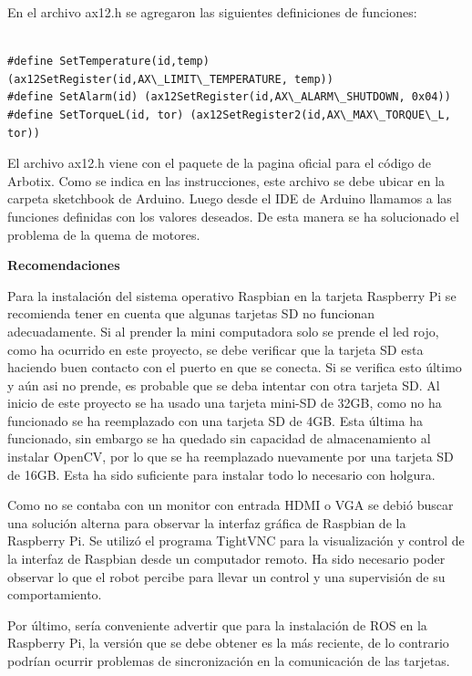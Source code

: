 \begin{itemize}
En el archivo ax12.h se agregaron las siguientes definiciones de funciones:

\begin{lstlisting}

#define SetTemperature(id,temp) (ax12SetRegister(id,AX\_LIMIT\_TEMPERATURE, temp))
#define SetAlarm(id) (ax12SetRegister(id,AX\_ALARM\_SHUTDOWN, 0x04)) 
#define SetTorqueL(id, tor) (ax12SetRegister2(id,AX\_MAX\_TORQUE\_L, tor)) 
\end{lstlisting}
 

El archivo ax12.h viene con el paquete de la pagina oficial para el código de Arbotix. Como se indica en las instrucciones, este archivo se debe ubicar en la carpeta sketchbook de Arduino. Luego desde el IDE de Arduino llamamos a las funciones definidas con los valores deseados. De esta manera se ha solucionado el problema de la quema de motores.

\end{itemize}

\textbf{Recomendaciones}  

Para la instalación del sistema operativo Raspbian en la tarjeta Raspberry Pi se recomienda tener en cuenta que algunas tarjetas SD no funcionan adecuadamente. Si al prender la mini computadora solo se prende el led rojo, como ha ocurrido en este proyecto, se debe verificar que la tarjeta SD esta haciendo buen contacto con el puerto en que se conecta. Si se verifica esto último y aún asi no prende, es probable que se deba intentar con otra tarjeta SD. Al inicio de este proyecto se ha usado una tarjeta mini-SD de 32GB, como no ha funcionado se ha reemplazado con una tarjeta SD de 4GB. Esta última ha funcionado, sin embargo se ha quedado sin capacidad de almacenamiento al instalar OpenCV, por lo que se ha reemplazado nuevamente por una tarjeta SD de 16GB. Esta ha sido suficiente para instalar todo lo necesario con holgura.    

Como no se contaba con un monitor con entrada HDMI o VGA se debió buscar una solución alterna para observar la interfaz gráfica de Raspbian de la Raspberry Pi. Se utilizó el programa TightVNC para la visualización y control de la interfaz de Raspbian desde un computador remoto. Ha sido necesario poder observar lo que el robot percibe para llevar un control y una supervisión de su comportamiento. 

Por último, sería conveniente advertir que para la instalación de ROS en la Raspberry Pi, la versión que se debe obtener es la más reciente, de lo contrario podrían ocurrir problemas de sincronización en la comunicación de las tarjetas.   




